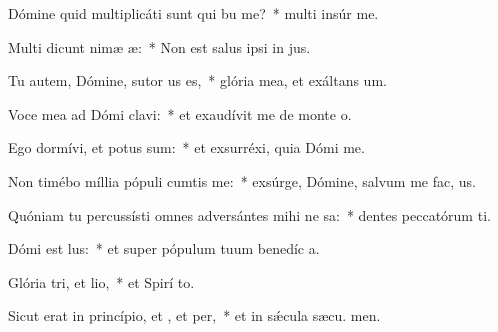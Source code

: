 \item Dómine quid multiplicáti sunt qui bu me?~* multi insúr  me.
\item Multi dicunt nimæ æ:~* Non est salus ipsi in  jus.
\item Tu autem, Dómine, sutor us es,~* glória mea, et exáltans  um.
\item Voce mea ad Dómi clavi:~* et exaudívit me de monte  o.
\item Ego dormívi, et potus sum:~* et exsurréxi, quia Dómi  me.
\item Non timébo míllia pópuli cumtis me:~* exsúrge, Dómine, salvum me fac,  us.
\item Quóniam tu percussísti omnes adversántes mihi ne sa:~* dentes peccatórum ti.
\item Dómi est lus:~* et super pópulum tuum benedíc a.
\item Glória tri, et lio,~* et Spirí to.
\item Sicut erat in princípio, et , et per,~* et in sǽcula sæcu. men.

